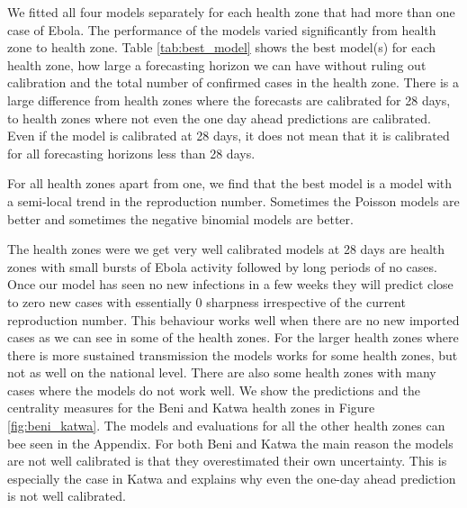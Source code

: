 \documentclass[12pt]{article}
\begin{document}
We fitted all four models separately for each health zone that had more than one case of Ebola. The performance of the models varied significantly from health zone to health zone. Table \ref{tab:best_model} shows the best model(s) for each health zone, how large a forecasting horizon we can have without ruling out calibration and the total number of confirmed cases in the health zone. There is a large difference from health zones where the forecasts are calibrated for 28 days, to health zones where not even the one day ahead predictions are calibrated. Even if the model is calibrated at 28 days, it does not mean that it is calibrated for all forecasting horizons less than 28 days. 




For all health zones apart from one, we find that the best model is a model with a semi-local trend in the reproduction number. Sometimes the Poisson models are better and sometimes the negative binomial models are better.

The health zones were we get very well calibrated models at 28 days are health zones with small bursts of Ebola activity followed by long periods of no cases. Once our model has seen no new infections in a few weeks they will predict close to zero new cases with essentially 0 sharpness irrespective of the current reproduction number. This behaviour works well when there are no new imported cases as we can see in some of the health zones. For the larger health zones where there is more sustained transmission the models works for some health zones, but not as well on the national level. There are also some health zones with many cases where the models do not work well. We show the predictions and the centrality measures for the Beni and Katwa health zones in Figure \ref{fig:beni_katwa}. The models and evaluations for all the other health zones can bee seen in the Appendix. For both Beni and Katwa the main reason the models are not well calibrated is that they overestimated their own uncertainty. This is especially the case in Katwa and explains why even the one-day ahead prediction is not well calibrated. 
\end{document}
